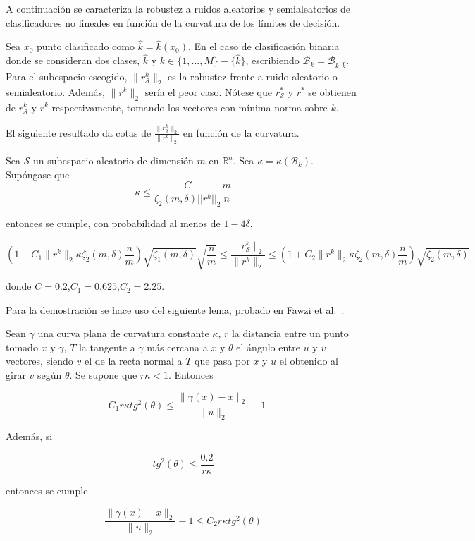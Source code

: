 A continuación se caracteriza la robustez a ruidos aleatorios y semialeatorios de clasificadores no lineales en función de la curvatura de los límites de decisión.

Sea $x_0$ punto clasificado como $\widehat{k}=\widehat{k}(x_0)$. En el caso de clasificación binaria donde se consideran dos clases, $\widehat{k}$ y $k \in \{1,...,M\}-\{\widehat{k}\}$, escribiendo $\mathcal{B}_k = \mathcal{B}_{k,\widehat{k}}$. Para el subespacio escogido, $\|r_\mathcal{S}^k \|_2$ es la robustez frente a ruido aleatorio o semialeatorio. Además, $\|r^k \|_2$ sería el peor caso. Nótese que $r_\mathcal{S}^*$ y $r^*$ se obtienen de $r_\mathcal{S}^k$ y $r^k$ respectivamente, tomando los vectores con mínima norma sobre $k$.

El siguiente resultado da cotas de $\frac{\|r_\mathcal{S}^k \|_2}{\|r^k \|_2}$ en función de la curvatura.

\begin{teorema} \label{teom224}
Sea $\mathcal{S}$ un subespacio aleatorio de dimensión $m$ en $\mathbb{R}^n$. Sea $\kappa = \kappa (\mathcal{B}_k)$. Supóngase que
$$\kappa \leq \frac{C}{\zeta_2 (m,\delta) ||r^k||_2} \frac{m}{n}$$

entonces se cumple, con probabilidad al menos de $1-4\delta$,

$$\left( 1- C_1 \|r^k \|_2 \kappa \zeta_2(m,\delta) \frac{n}{m} \right) \sqrt{\zeta_1 (m,\delta)} \sqrt{\frac{n}{m}} \leq \frac{\|r_\mathcal{S}^k \|_2}{\|r^k \|_2} \leq \left( 1+C_2 \|r^k \|_2 \kappa \zeta_2 (m,\delta) \frac{n}{m} \right) \sqrt{\zeta_2 (m,\delta)}$$

donde $C=0.2$,$C_1=0.625$,$C_2=2.25$.

\end{teorema}

Para la demostración se hace uso del siguiente lema, probado en Fawzi et al.~\cite{CurvLimites}.

\begin{lema} \label{lem223}
Sean $\gamma$ una curva plana de curvatura constante $\kappa$, $r$ la distancia entre un punto tomado $x$ y $\gamma$, $T$ la tangente a $\gamma$ más cercana a $x$ y $\theta$ el ángulo entre $u$ y $v$ vectores, siendo $v$ el de la recta normal a $T$ que pasa por $x$ y $u$ el obtenido al girar $v$ según $\theta$. Se supone que $r \kappa < 1$. Entonces

$$-C_1 r \kappa tg^2(\theta) \leq \frac{\|\gamma(x) - x \|_2}{\|u \|_2} - 1$$

Además, si

$$tg^2(\theta) \leq \frac{0.2}{r \kappa}$$

entonces se cumple

$$\frac{\|\gamma(x) - x \|_2}{\|u \|_2} - 1 \leq C_2 r \kappa tg^2(\theta)$$

\end{lema}

